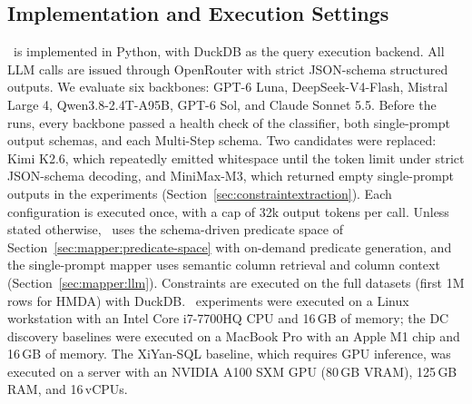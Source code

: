 \subsection{Implementation and Execution Settings}
\label{sec:implementation}

\system\ is implemented in Python, with DuckDB as the query execution backend.
All LLM calls are issued through OpenRouter with strict JSON-schema structured
outputs. We evaluate six backbones: GPT-6 Luna, DeepSeek-V4-Flash, Mistral Large 4,
Qwen3.8-2.4T-A95B, GPT-6 Sol, and Claude Sonnet 5.5. Before the runs, every
backbone passed a health check of the classifier, both single-prompt output
schemas, and each Multi-Step schema. Two candidates were replaced: Kimi K2.6,
which repeatedly emitted whitespace until the token limit under strict
JSON-schema decoding, and MiniMax-M3, which returned empty single-prompt outputs
in the experiments (Section~\ref{sec:constraintextraction}). Each configuration is executed once, with a cap of 32k
output tokens per call. Unless stated otherwise, \system\ uses the schema-driven
predicate space of Section~\ref{sec:mapper:predicate-space} with on-demand predicate
generation, and the single-prompt mapper uses semantic column retrieval and
column context (Section~\ref{sec:mapper:llm}). Constraints are executed on the
full datasets (first 1M rows for HMDA) with DuckDB. \system\ experiments were
executed on a Linux workstation with an Intel Core i7-7700HQ CPU and 16\,GB of
memory; the DC discovery baselines were executed on a MacBook
Pro with an Apple M1 chip and 16\,GB of memory. The XiYan-SQL
baseline, which requires GPU inference, was executed on a server with an
NVIDIA A100 SXM GPU (80\,GB VRAM), 125\,GB RAM, and 16\,vCPUs.





